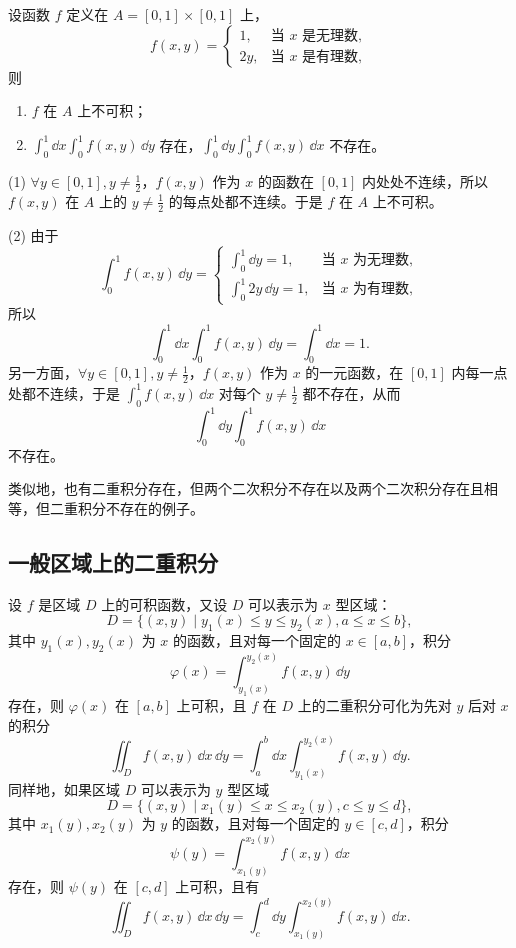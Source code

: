 \begin{xexample}[22.2.2]
设函数 $f$ 定义在 $A=[0,1]\times[0,1]$ 上，
\[
  f(x,y)=
  \begin{cases}
    1, & \text{当 }x\text{ 是无理数},\\
    2y, & \text{当 }x\text{ 是有理数},
  \end{cases}
\]
则
\begin{enumerate}[label=(\arabic*)]
  \item $f$ 在 $A$ 上不可积；
  \item $\displaystyle\int_0^1\dd x\int_0^1f(x,y)\,\dd y$ 存在，$\displaystyle\int_0^1\dd y\int_0^1f(x,y)\,\dd x$ 不存在。
\end{enumerate}
\end{xexample}
\begin{xproof}
(1) $\forall y\in[0,1],y\ne\frac12$，$f(x,y)$ 作为 $x$ 的函数在 $[0,1]$ 内处处不连续，所以 $f(x,y)$ 在 $A$ 上的 $y\ne\frac12$ 的每点处都不连续。于是 $f$ 在 $A$ 上不可积。

(2) 由于
\[
  \int_0^1f(x,y)\,\dd y=
  \begin{cases}
    \displaystyle\int_0^1\dd y=1, & \text{当 }x\text{ 为无理数},\\
    \displaystyle\int_0^1 2y\,\dd y=1, & \text{当 }x\text{ 为有理数},
  \end{cases}
\]
所以
\[
  \int_0^1\dd x\int_0^1f(x,y)\,\dd y=\int_0^1\dd x=1.
\]
另一方面，$\forall y\in[0,1],y\ne\frac12$，$f(x,y)$ 作为 $x$ 的一元函数，在 $[0,1]$ 内每一点处都不连续，于是 $\int_0^1f(x,y)\,\dd x$ 对每个 $y\ne\frac12$ 都不存在，从而
\[
  \int_0^1\dd y\int_0^1f(x,y)\,\dd x
\]
不存在。
\end{xproof}

类似地，也有二重积分存在，但两个二次积分不存在以及两个二次积分存在且相等，但二重积分不存在的例子。

\subsection{一般区域上的二重积分}

设 $f$ 是区域 $D$ 上的可积函数，又设 $D$ 可以表示为 $x$ 型区域：
\[
  D=\{(x,y)\mid y_1(x)\le y\le y_2(x),a\le x\le b\},
\]
其中 $y_1(x),y_2(x)$ 为 $x$ 的函数，且对每一个固定的 $x\in[a,b]$，积分
\[
  \varphi(x)=\int_{y_1(x)}^{y_2(x)}f(x,y)\,\dd y
\]
存在，则 $\varphi(x)$ 在 $[a,b]$ 上可积，且 $f$ 在 $D$ 上的二重积分可化为先对 $y$ 后对 $x$ 的积分
\[
  \iint_D f(x,y)\,\dd x\,\dd y
  =\int_a^b\dd x\int_{y_1(x)}^{y_2(x)}f(x,y)\,\dd y.
\]
同样地，如果区域 $D$ 可以表示为 $y$ 型区域
\[
  D=\{(x,y)\mid x_1(y)\le x\le x_2(y),c\le y\le d\},
\]
其中 $x_1(y),x_2(y)$ 为 $y$ 的函数，且对每一个固定的 $y\in[c,d]$，积分
\[
  \psi(y)=\int_{x_1(y)}^{x_2(y)}f(x,y)\,\dd x
\]
存在，则 $\psi(y)$ 在 $[c,d]$ 上可积，且有
\[
  \iint_D f(x,y)\,\dd x\,\dd y
  =\int_c^d\dd y\int_{x_1(y)}^{x_2(y)}f(x,y)\,\dd x.
\]

